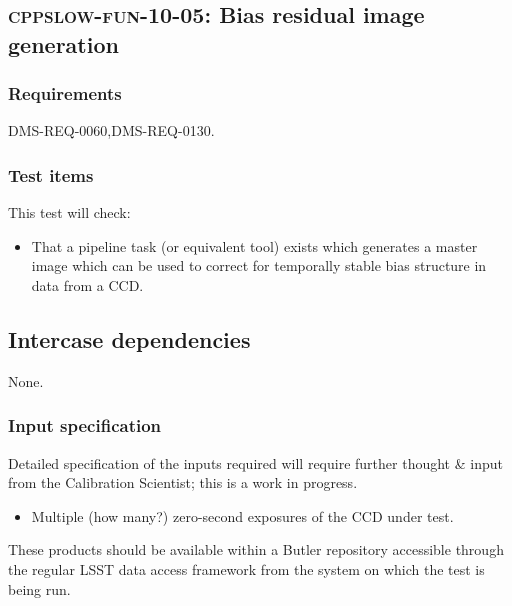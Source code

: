 \subsection{\textsc{cppslow-fun-10-05}: Bias residual image generation}
\label{cppslow-fun-10-05}

\subsubsection{Requirements}

DMS-REQ-0060,DMS-REQ-0130.

\subsubsection{Test items}

This test will check:

\begin{itemize}

  \item{That a pipeline task (or equivalent tool) exists which generates a
  master image which can be used to correct for temporally stable bias structure
  in data from a CCD.}

\end{itemize}

\subsection{Intercase dependencies}

None.

\subsubsection{Input specification}

\begin{note}
Detailed specification of the inputs required will require further thought \&
input from the Calibration Scientist; this is a work in progress.
\end{note}

\begin{itemize}

  \item{Multiple (how many?) zero-second exposures of the CCD under test.}

\end{itemize}

These products should be available within a Butler repository accessible
through the regular LSST data access framework from the system on which the test
is being run.

